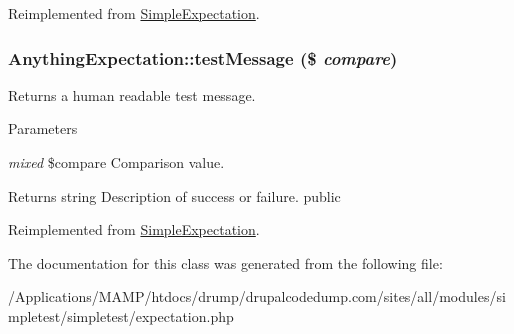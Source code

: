 Reimplemented from \hyperlink{class_simple_expectation_aa2b98f827e7487ebe12cedb9ad39d061}{SimpleExpectation}.\hypertarget{class_anything_expectation_aca28056e014baf523837ac281de6bea8}{
\subsubsection[{testMessage}]{\setlength{\rightskip}{0pt plus 5cm}AnythingExpectation::testMessage (\$ {\em compare})}}
\label{class_anything_expectation_aca28056e014baf523837ac281de6bea8}
Returns a human readable test message. 
\begin{DoxyParams}{Parameters}
\item[{\em mixed}]\$compare Comparison value. \end{DoxyParams}
\begin{DoxyReturn}{Returns}
string Description of success or failure.  public 
\end{DoxyReturn}


Reimplemented from \hyperlink{class_simple_expectation_a15b69edf659c76f6543aa98d8d85b025}{SimpleExpectation}.

The documentation for this class was generated from the following file:\begin{DoxyCompactItemize}
\item 
/Applications/MAMP/htdocs/drump/drupalcodedump.com/sites/all/modules/simpletest/simpletest/expectation.php\end{DoxyCompactItemize}
